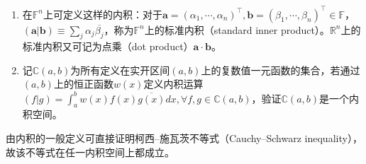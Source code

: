 \documentclass[../main.tex]{subfiles}
\begin{document}
\begin{example}
    \quad
    \begin{enumerate}
        \item 在$\mathbb{F}^n$上可定义这样的内积：对于$\mathbf{a}=\left(\alpha_1,\cdots,\alpha_n\right)^\intercal,\mathbf{b}=\left(\beta_1,\cdots,\beta_n\right)^\intercal\in\mathbb{F}$，$\left(\mathbf{a}|\mathbf{b}\right)\equiv\sum_j\alpha_j\overline{\beta_j}$，称为$\mathbb{F}^n$上的标准内积（standard inner product）。$\mathbb{R}^n$上的标准内积又可记为点乘（dot product）$\mathbf{a}\cdot\mathbf{b}$。
        \item 记$\mathbb{C}\left(a,b\right)$为所有定义在实开区间$\left(a,b\right)$上的复数值一元函数的集合，若通过$\left(a,b\right)$上的恒正函数$w\left(x\right)$定义内积运算$\left(f|g\right)=\int_{a}^{b}w\left(x\right)f\left(x\right)\overline{g\left(x\right)}dx,\forall f,g\in\mathbb{C}\left(a,b\right)$，验证$\mathbb{C}\left(a,b\right)$是一个内积空间。
    \end{enumerate}
\end{example}

由内积的一般定义可直接证明柯西--施瓦茨不等式（Cauchy--Schwarz inequality），故该不等式在任一内积空间上都成立。
\end{document}
